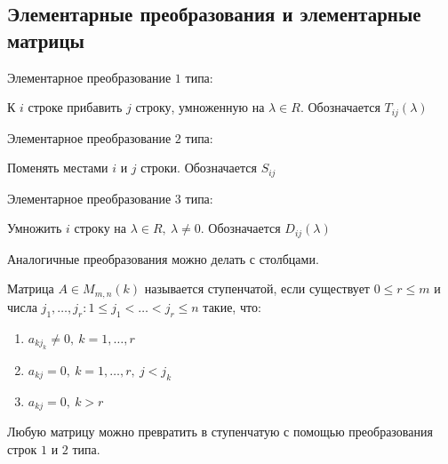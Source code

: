 \subsection{Элементарные преобразования и элементарные матрицы}

\begin{defn}
    Элементарное преобразование $1$ типа:

    К $i$ строке прибавить $j$ строку, умноженную на $\lambda \in R$. Обозначается $T_{ij}(\lambda)$
\end{defn}

\begin{defn}
    Элементарное преобразование $2$ типа:

    Поменять местами $i$ и $j$ строки. Обозначается $S_{ij}$
\end{defn}

\begin{defn}
    Элементарное преобразование $3$ типа:

    Умножить $i$ строку на $\lambda \in R,~\lambda \neq 0$. Обозначается $D_{ij}(\lambda)$
\end{defn}

\begin{notice}
    Аналогичные преобразования можно делать с столбцами.
\end{notice}

\begin{defn}
    Матрица $A \in M_{m, n}(k)$ называется ступенчатой, если существует $0 \leq r \leq m$ и числа $j_1, \ldots, j_r: 1 \leq j_1 < \ldots < j_r \leq n$ такие, что:
    
    \begin{enumerate}
        \item $a_{kj_k} \neq 0,~k = 1, \ldots, r$
        
        \item $a_{kj} = 0,~k = 1, \ldots, r,~j < j_k$
        
        \item $a_{kj} = 0,~k > r$
    \end{enumerate}
\end{defn} 

\begin{theorem-non}
    Любую матрицу можно превратить в ступенчатую с помощью преобразования строк $1$ и $2$ типа.
\end{theorem-non}

